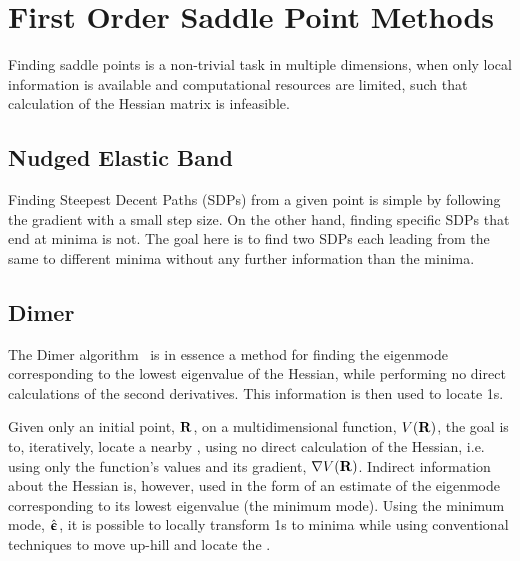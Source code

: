\section{First Order Saddle Point Methods}
\label{sec:sps}

Finding saddle points is a non-trivial task in multiple dimensions, when only local information is available and computational resources are limited, such that calculation of the Hessian matrix is infeasible.

\incomplete

\subsection{Nudged Elastic Band}
\label{sec:neb}

Finding Steepest Decent Paths (SDPs) from a given point is simple by following the gradient with a small step size.
On the other hand, finding specific SDPs that end at minima is not.
The goal here is to find two SDPs each leading from the same  to different minima without any further information than the minima.


\incomplete

\subsection{Dimer}
\label{sec:dimer}

The Dimer algorithm~\cite{dimer-original-1999} is in essence a method for finding the eigenmode corresponding to the lowest eigenvalue of the Hessian, while performing no direct calculations of the second derivatives.
This information is then used to locate \sap1s.


Given only an initial point, ${\mathrm{\mathbf{\bm{R}}}}$, on a multidimensional function, $V({\mathrm{\mathbf{\bm{R}}}})$, the goal is to, iteratively, locate a nearby , using no direct calculation of the Hessian, i.e. using only the function's values and its gradient, $\nabla V({\mathrm{\mathbf{\bm{R}}}})$.
Indirect information about the Hessian is, however, used in the form of an estimate of the eigenmode corresponding to its lowest eigenvalue (the minimum mode).
Using the minimum mode, $\hat{{\mathrm{\mathbf{\bm{\upepsilon}}}}}$, it is possible to locally transform \sap1s to minima while using conventional techniques to move up-hill and locate the .

